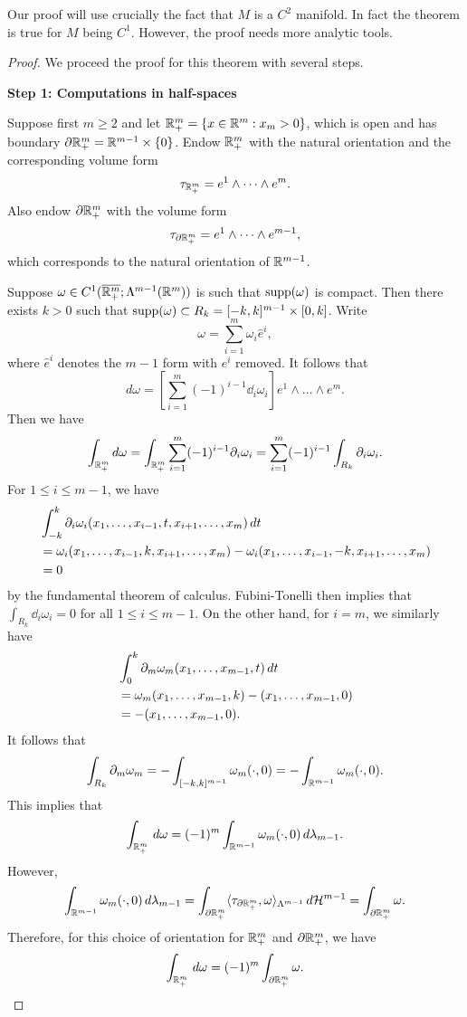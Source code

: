 \documentclass[a4paper]{article}
\begin{document}
\begin{remark}
Our proof will use crucially the fact that $M$ is a $C^2$
manifold. In fact the theorem is true for $M$ being
$C^1$. However, the proof needs more analytic tools.
\end{remark}

\begin{proof}
We proceed the proof for this theorem with several steps.

\textbf{Step 1: Computations in half-spaces}

Suppose first $m \geq 2$ and let
$\mathbb{R}^m_+ = \{x \in \mathbb{R}^m : x_m > 0\}$, which is open
and has boundary
$\partial \mathbb{R}^m_+ = \mathbb{R}^{m-1} \times \{0\}$. Endow $\mathbb{R}^m_+$ with
the natural orientation and the corresponding volume
form
\[
\tau_{\mathbb{R}^m_+} = e^1 \wedge \dots \wedge e^m.
\]
Also endow $\partial \mathbb{R}^m_+$ with the volume form
\[
\tau_{\partial \mathbb{R}^m_+} = e^1 \wedge \dots \wedge e^{m-1},
\]
which corresponds to the natural orientation of $\mathbb{R}^{m-1}$.

Suppose $\omega \in C^1 (\overline{\mathbb{R}^{m}_+} ; \Lambda^{m-1}
(\mathbb{R}^m))$ is such that $\operatorname{supp}(\omega)$ is compact.
Then there exists $k > 0$ such that $\operatorname{supp} (\omega)
\subset R_k = [-k, k]^{m-1} \times [0, k]$.
Write
\[
\omega = \sum_{i=1}^m \omega_i \hat{e}^i,
\]
where $\hat{e}^i$ denotes the $m-1$ form with $e^i$ removed.
It follows that
\[
d \omega = \left[ \sum_{i=1}^m (-1)^{i-1} \dd_i \omega_i
\right] e^1 \wedge \dots \wedge e^m.
\]
Then we have
\[
\int_{\mathbb{R}^m_+} d \omega =
\int_{\mathbb{R}^m_+} \sum_{i=1}^m (-1)^{i-1} \partial_i \omega_i
= \sum_{i=1}^m (-1)^{i-1} \int_{R_k} \partial_i \omega_i.
\]
For $1 \leq i \leq m - 1$, we have
\[
\begin{aligned}
  &\int_{-k}^k \partial_i \omega_i (x_1, \dots, x_{i-1},
  t, x_{i+1}, \dots, x_m) \, d t \\
  &= \omega_i (x_1, \dots, x_{i-1}, k, x_{i+1}, \dots, x_m)
  - \omega_i (x_1, \dots, x_{i-1}, -k, x_{i+1}, \dots, x_m) \\
  &= 0
\end{aligned}
\]
by the fundamental theorem of calculus.
Fubini-Tonelli then implies that $\int_{R_k} \dd_i \omega_i
= 0$ for all $1 \leq i \leq m - 1$. On the other hand,
for $i = m$, we similarly have
\[
\begin{aligned}
&\int_0^k \partial_m \omega_m (x_1, \dots, x_{m-1}, t) \, d t \\
&= \omega_m (x_1, \dots, x_{m-1}, k)
- (x_1, \dots, x_{m-1}, 0) \\
&= - (x_1, \dots, x_{m-1}, 0).
\end{aligned}
\]
It follows that
\[
\int_{R_k} \partial_m \omega_m
= - \int_{[-k, k]^{m-1}} \omega_m (\cdot, 0)
= - \int_{\mathbb{R}^{m-1}} \omega_m (\cdot, 0).
\]
This implies that
\[
\int_{\mathbb{R}^m_+} \, d \omega
= (-1)^m \int_{\mathbb{R}^{m-1}} \omega_m (\cdot, 0) \, d \lambda_{m-1}.
\]
However,
\[
\int_{\mathbb{R}^{m-1}} \omega_m (\cdot, 0) \, d \lambda_{m-1}
= \int_{\partial \mathbb{R}^m_+} \langle \tau_{\partial \mathbb{R}^m_+}, \omega
\rangle_{\Lambda^{m-1}}
\, d \mathcal{H}^{m-1}
= \int_{\partial \mathbb{R}^{m}_+} \omega.
\]
Therefore, for this choice of orientation for $\mathbb{R}^m_+$
and $\partial \mathbb{R}^m_+$, we have
\[
\int_{\mathbb{R}^m_+} \, d \omega = (-1)^m \int_{\partial \mathbb{R}^m_+} \omega.
\]


\end{proof}
\end{document}
